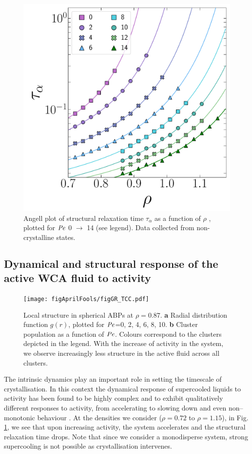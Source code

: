 \begin{figure}
\includegraphics[width=0.7\linewidth]{figAprilFools/figAngell.pdf}
\caption[Structural relaxation in a fluid of active Brownian spheres]{Angell plot of structural relaxation time $\tau_\alpha$ as a function of $\rho$ , plotted for $\operatorname{\mathit{P\kern-.08em e}}$ 0 $\rightarrow$ 14 (see legend). Data collected from non-crystalline states.}
\label{figAngell}
\end{figure}




\subsection{Dynamical and structural response of the active WCA fluid to activity}
\label{sectionDynamicalStructuralResponse}

\begin{figure}
\texttt{[image: figAprilFools/figGR\_TCC.pdf]}

\caption[Local structure in spherical active Brownian particles]{Local structure in spherical ABPs at $\rho=0.87$. \textbf{a} Radial distribution function $g(r)$, plotted for $\operatorname{\mathit{P\kern-.08em e}}$=0, 2, 4, 6, 8, 10. \textbf{b} Cluster population as a function of $\operatorname{\mathit{P\kern-.08em e}}$. Colours correspond to the clusters depicted in the legend. With the increase of activity in the system, we observe increasingly less structure in the active fluid across all clusters. }
\label{figGR_TCC}
\end{figure}


The intrinsic dynamics play an important role in setting the timescale of crystallisation. In this context the dynamical response of supercooled liquids to activity has been found to be highly complex and to exhibit qualitatively different responses to activity, from accelerating to slowing down and even non--monotonic behaviour \cite{janssen2019,szamel2015,berthier2017,dougan2016}. At the densities we consider ($\rho=0.72$ to $\rho=1.15$), in Fig. \ref{figAngell}, we see that upon increasing activity, the system accelerates and the structural relaxation time drops. Note that since we consider a monodisperse system, strong supercooling is not possible as crystallisation intervenes.


